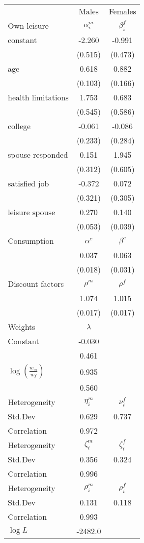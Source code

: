 \begin{tabular}{lcc} 
\hline\hline 
 & Males & Females \\ 
Own leisure & $\alpha_{i}^{m}$ & $\beta_{i}^{f}$ \\ 
constant & -2.260 & -0.991 \\ 
 & (0.515) & (0.473) \\ 
age & 0.618 & 0.882 \\ 
 & (0.103) & (0.166) \\ 
health limitations & 1.753 & 0.683 \\ 
 & (0.545) & (0.586) \\ 
college & -0.061 & -0.086 \\ 
 & (0.233) & (0.284) \\ 
spouse responded & 0.151 & 1.945 \\ 
 & (0.312) & (0.605) \\ 
satisfied job & -0.372 & 0.072 \\ 
 & (0.321) & (0.305) \\ 
leisure spouse & 0.270 & 0.140 \\ 
 & (0.053) & (0.039) \\ 
Consumption & $\alpha^{c}$ & $\beta^{c}$ \\ 
 & 0.037 & 0.063 \\ 
 & (0.018) & (0.031) \\ 
Discount factors & $\rho^m$ & $\rho^f$ \\ 
 & 1.074 & 1.015 \\ 
 & (0.017) & (0.017) \\ 
Weights & $\lambda$ &  \\ 
Constant & -0.030 &  \\ 
 & 0.461 &  \\ 
$\log(\frac{w_m}{w_f})$ & 0.935 &  \\ 
 & 0.560 &  \\ 
Heterogeneity & $\eta_i^m$ & $\nu_i^f$ \\ 
Std.Dev & 0.629 & 0.737 \\ 
Correlation & 0.972 &  \\ 
Heterogeneity & $\zeta_i^m$ & $\zeta_i^f$ \\ 
Std.Dev & 0.356 & 0.324 \\ 
Correlation & 0.996 &  \\ 
Heterogeneity & $\rho_i^m$ & $\rho_i^f$ \\ 
Std.Dev & 0.131 & 0.118 \\ 
Correlation & 0.993 &  \\ 
\hline 
$\log L$ & -2482.0 & \\ 
\hline \hline 
\end{tabular} 
